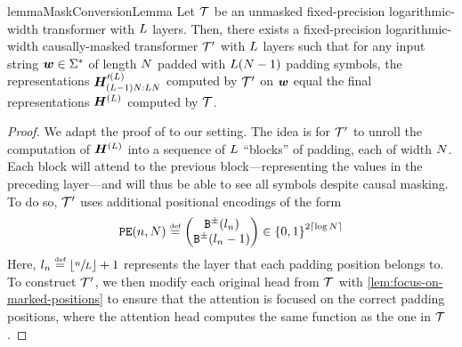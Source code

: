 \begin{restatable}{lemma}{MaskConversionLemma}\label{lem:mask-conversion}
   Let ${{\mathcal{T}}}$ be an unmasked fixed-precision logarithmic-width transformer with ${{L}}$ layers.
   Then, there exists a fixed-precision logarithmic-width causally-masked transformer ${{\mathcal{T}}}'$ with ${{L}}$ layers such that for any input string ${{\boldsymbol{w}}} \in {{{{{{\Sigma}}^{*}}}}}$ of length ${{N}}$ padded with ${{L}} ({{N}} - 1)$ padding symbols, the representations ${{{{{\bm{H}}}}}}^{\prime({{L}})}_{({{L}} - 1) {{N}} : {{L}} {{N}}}$ computed by ${{\mathcal{T}}}'$ on ${{\boldsymbol{w}}}$ equal the final representations ${{{{{\bm{H}}}}}}^{({{L}})}$ computed by ${{\mathcal{T}}}$.
\end{restatable}
\begin{proof}
   We adapt the proof of \citet[][Lem. 1]{merrill2025exactexpressivepowertransformers} to our setting.
   The idea is for ${{\mathcal{T}}}'$ to unroll the computation of ${{{{{\bm{H}}}}}}^{({{L}})}$ into a sequence of ${{L}}$ ``blocks'' of padding, each of width ${{N}}$. 
   Each block will attend to the previous block---representing the values in the preceding layer---and will thus be able to see all symbols despite causal masking.
   To do so, ${{\mathcal{T}}}'$ uses additional positional encodings of the form   
   \begin{equation}
      \posEncFun{\stridx, \strlen} \defeq 
      \begin{pmatrix}
         \sbinFun{\layeridx_\stridx} \\
         \sbinFun{\layeridx_\stridx - 1} \\
      \end{pmatrix} \in \set{0, 1}^{2 \ceil{\log\strlen}}
   \end{equation}
   Here, ${{l}}_{{n}} \mathrel{\stackrel{\textnormal{\tiny def}}{=}} {\left\lfloor \sfrac{{{n}}}{{{L}}} \right\rfloor} + 1$ represents the layer that each padding position belongs to.
   To construct ${{\mathcal{T}}}'$, we then modify each original head from ${{\mathcal{T}}}$ with \cref{lem:focus-on-marked-positions} to ensure that the attention is focused on the correct padding positions, where the attention head computes the same function as the one in ${{\mathcal{T}}}$. 
\end{proof}

